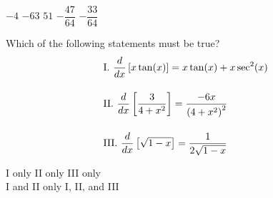 \begin{questions}
    \begin{oneparchoices}
        \choice $-4$
        \choice $-63$
        \choice $51$
        \choice $-\dfrac{47}{64}$
        \choice $-\dfrac{33}{64}$
    \end{oneparchoices} \par \horizontalline

    \question Which of the following statements must be true? \begin{align*}
        & \text{I. } \dfrac{d}{dx} \left[x\tan (x)\right] = x\tan (x) + x\sec^2 (x) \\[11pt]
        & \text{II. } \dfrac{d}{dx} \left[\dfrac{3}{4 + x^2}\right] = \dfrac{-6x}{\left(4 + x^2\right)^2} \\[11pt]
        & \text{III. } \dfrac{d}{dx} \left[\sqrt{1 - x}\right] = \dfrac{1}{2\sqrt{1 - x}}
    \end{align*}

    \begin{oneparchoices}
        \choice I only 
        \choice II only 
        \choice III only \\[11pt]
        \makebox[0.2 \textwidth] \choice I and II only 
        \makebox[0.25 \textwidth] \choice I, II, and III
    \end{oneparchoices} \par \horizontalline
\end{questions}





